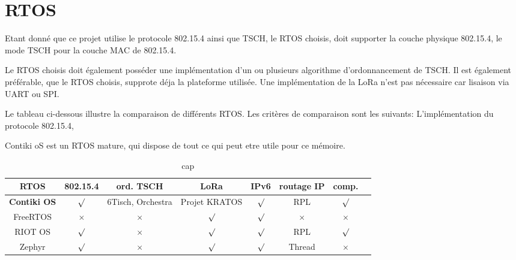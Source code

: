 \section{RTOS}

Etant donné que ce projet utilise le protocole 802.15.4 ainsi que TSCH, le RTOS choisis, doit supporter la couche physique 802.15.4, le mode TSCH pour la couche MAC de 802.15.4.

Le RTOS choisis doit également posséder une implémentation d'un ou plusieurs algorithme d'ordonnancement de TSCH. Il est également préférable, que le RTOS choisis, supprote déja la plateforme utilisée. Une implémentation de la LoRa n'est pas nécessaire car lisaison via UART ou SPI.

Le tableau ci-dessous illustre la comparaison de différents RTOS. Les critères de comparaison
sont les suivants: L'implémentation du protocole 802.15.4, 

Contiki oS est un RTOS mature, qui dispose de tout ce qui peut etre utile pour ce mémoire.




\begin{table}[H]
    \begin{adjustbox}{width=\textwidth}
        \begin{tabular}{c||c|c|c|c|c|c|c}
            RTOS                & 802.15.4 & ord. TSCH         & LoRa          & IPv6    & routage IP & comp.   \\ \hline

            \textbf{Contiki OS} & $\surd$  & 6Tisch, Orchestra & Projet KRATOS & $\surd$ & RPL        & $\surd$ \\ \hline

            FreeRTOS            & $\times$ & $\times$          & $\surd$       & $\surd$ & $\times$   &    $\times$     \\ \hline

            RIOT OS             & $\surd$  & $\times$          & $\surd$       & $\surd$ & RPL        &    $\surd$     \\ \hline

            Zephyr              & $\surd$  & $\times$          & $\surd$       & $\surd$ & Thread     &    $\times$     \\
        \end{tabular}
    \end{adjustbox}
    \caption{cap}
    \label{label}
\end{table}